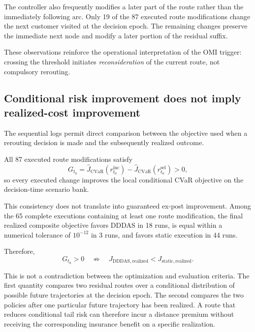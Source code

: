 \documentclass[preprint,12pt]{elsarticle}
\newcommand{\CVaR}{\mathrm{CVaR}}
\newcommand{\1}{\mathbf{1}}
\begin{document}
The controller also frequently modifies a later part of the route rather than
the immediately following arc. Only 19 of the 87 executed route modifications
change the next customer visited at the decision epoch. The remaining changes
preserve the immediate next node and modify a later portion of the residual
suffix.

These observations reinforce the operational interpretation of the OMI trigger:
crossing the threshold initiates \emph{reconsideration} of the current route,
not compulsory rerouting.

\subsection{Conditional risk improvement does not imply realized-cost improvement}
\label{subsec:results_exante_expost}

The sequential logs permit direct comparison between the objective used when a
rerouting decision is made and the subsequently realized outcome.

All 87 executed route modifications satisfy
\begin{equation}
	G_{t_0}
	=
	\widehat{J}_{\CVaR}
	(r^{\mathrm{inc}}_{t_0})
	-
	\widehat{J}_{\CVaR}
	(r^{\mathrm{sel}}_{t_0})
	>
	0,
\end{equation}
so every executed change improves the local conditional CVaR objective on the
decision-time scenario bank.

This consistency does not translate into guaranteed ex-post improvement.
Among the 65 complete executions containing at least one route modification,
the final realized composite objective favors DDDAS in 18 runs, is equal within
a numerical tolerance of $10^{-12}$ in 3 runs, and favors static execution in
44 runs.

Therefore,
\begin{equation}
	G_{t_0}>0
	\quad\not\Rightarrow\quad
	J_{\mathrm{DDDAS,realized}}
	<
	J_{\mathrm{static,realized}}.
\end{equation}

This is not a contradiction between the optimization and evaluation criteria.
The first quantity compares two residual routes over a conditional distribution
of possible future trajectories at the decision epoch. The second compares the
two policies after one particular future trajectory has been realized.
A route that reduces conditional tail risk can therefore incur a distance
premium without receiving the corresponding insurance benefit on a specific
realization.
\end{document}
